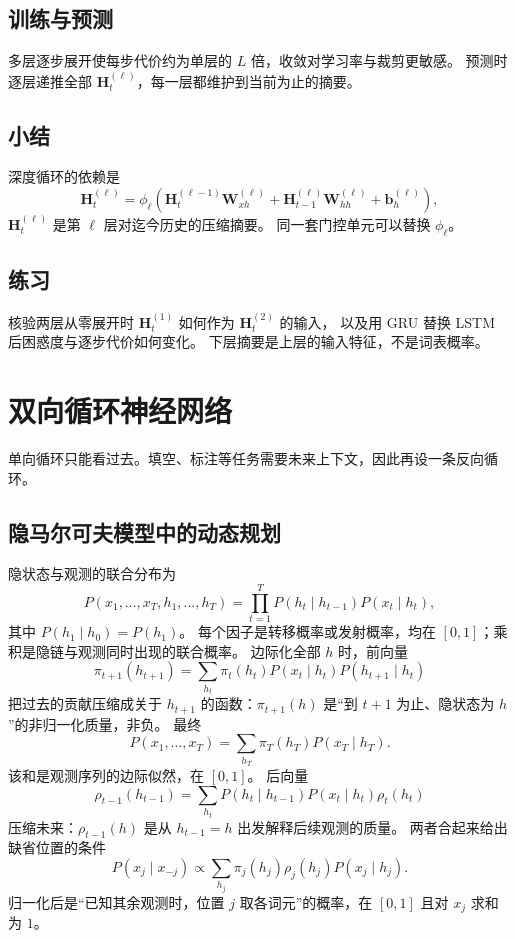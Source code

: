 \subsection{训练与预测}

多层逐步展开使每步代价约为单层的 $L$ 倍，收敛对学习率与裁剪更敏感。
预测时逐层递推全部 $\bm{H}_t^{(\ell)}$，每一层都维护到当前为止的摘要。

\subsection{小结}

深度循环的依赖是
\[
\bm{H}_t^{(\ell)}=
\phi_\ell(\bm{H}_t^{(\ell-1)}\bm{W}_{xh}^{(\ell)}+\bm{H}_{t-1}^{(\ell)}\bm{W}_{hh}^{(\ell)}+\bm{b}_h^{(\ell)}),
\]
$\bm{H}_t^{(\ell)}$ 是第 $\ell$ 层对迄今历史的压缩摘要。
同一套门控单元可以替换 $\phi_\ell$。

\subsection{练习}

核验两层从零展开时 $\bm{H}_t^{(1)}$ 如何作为 $\bm{H}_t^{(2)}$ 的输入，
以及用 GRU 替换 LSTM 后困惑度与逐步代价如何变化。
下层摘要是上层的输入特征，不是词表概率。

\section{双向循环神经网络}




单向循环只能看过去。填空、标注等任务需要未来上下文，因此再设一条反向循环。

\subsection{隐马尔可夫模型中的动态规划}

隐状态与观测的联合分布为
\[
P(x_1,\ldots,x_T,h_1,\ldots,h_T)
=
\prod_{t=1}^{T}P(h_t \mid h_{t-1})P(x_t \mid h_t),
\]
其中 $P(h_1 \mid h_0)=P(h_1)$。
每个因子是转移概率或发射概率，均在 $[0,1]$；乘积是隐链与观测同时出现的联合概率。
边际化全部 $h$ 时，前向量
\[
\pi_{t+1}(h_{t+1})
=
\sum_{h_t}\pi_t(h_t)P(x_t \mid h_t)P(h_{t+1} \mid h_t)
\]
把过去的贡献压缩成关于 $h_{t+1}$ 的函数：$\pi_{t+1}(h)$ 是“到 $t+1$ 为止、隐状态为 $h$”的非归一化质量，非负。
最终
\[
P(x_1,\ldots,x_T)=\sum_{h_T}\pi_T(h_T)P(x_T \mid h_T).
\]
该和是观测序列的边际似然，在 $[0,1]$。
后向量
\[
\rho_{t-1}(h_{t-1})
=
\sum_{h_t}P(h_t \mid h_{t-1})P(x_t \mid h_t)\rho_t(h_t)
\]
压缩未来：$\rho_{t-1}(h)$ 是从 $h_{t-1}=h$ 出发解释后续观测的质量。
两者合起来给出缺省位置的条件
\[
P(x_j \mid x_{-j})
\propto
\sum_{h_j}\pi_j(h_j)\rho_j(h_j)P(x_j \mid h_j).
\]
归一化后是“已知其余观测时，位置 $j$ 取各词元”的概率，在 $[0,1]$ 且对 $x_j$ 求和为 $1$。

